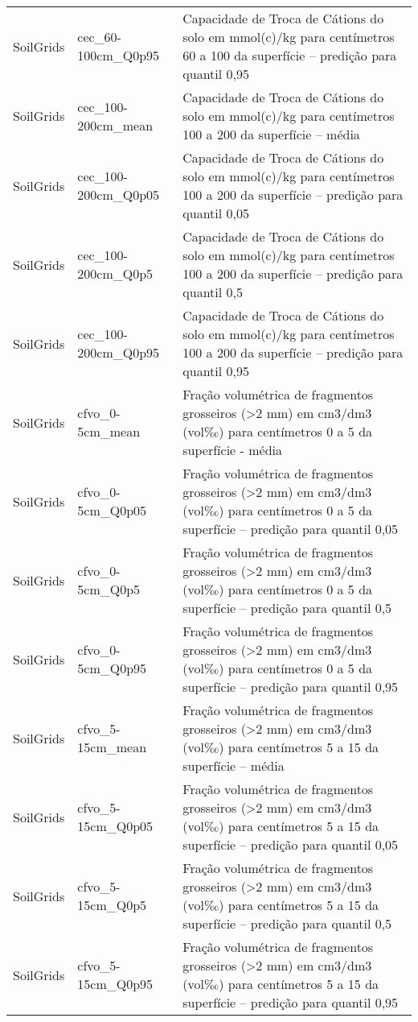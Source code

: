 \begin{longtable}{@{} p{4cm} p{4cm} p{8cm} @{}}
	SoilGrids &
	cec\_60-100cm\_Q0p95 &
	Capacidade de Troca de Cátions do solo em mmol(c)/kg para centímetros 60 a 100 da superfície – predição para quantil 0,95 \\
	SoilGrids &
	cec\_100-200cm\_mean &
	Capacidade de Troca de Cátions do solo em mmol(c)/kg para centímetros 100 a 200 da superfície – média \\
	SoilGrids &
	cec\_100-200cm\_Q0p05 &
	Capacidade de Troca de Cátions do solo em mmol(c)/kg para centímetros 100 a 200 da superfície – predição para quantil 0,05 \\
	SoilGrids &
	cec\_100-200cm\_Q0p5 &
	Capacidade de Troca de Cátions do solo em mmol(c)/kg para centímetros 100 a 200 da superfície – predição para quantil 0,5 \\
	SoilGrids &
	cec\_100-200cm\_Q0p95 &
	Capacidade de Troca de Cátions do solo em mmol(c)/kg para centímetros 100 a 200 da superfície – predição para quantil 0,95 \\
	SoilGrids &
	cfvo\_0-5cm\_mean &
	Fração volumétrica de fragmentos grosseiros (\textgreater 2 mm) em cm3/dm3 (vol‰) para centímetros 0 a 5 da superfície - média \\
	SoilGrids &
	cfvo\_0-5cm\_Q0p05 &
	Fração volumétrica de fragmentos grosseiros (\textgreater 2 mm) em cm3/dm3 (vol‰) para centímetros 0 a 5 da superfície – predição para quantil 0,05 \\
	SoilGrids &
	cfvo\_0-5cm\_Q0p5 &
	Fração volumétrica de fragmentos grosseiros (\textgreater 2 mm) em cm3/dm3 (vol‰) para centímetros 0 a 5 da superfície – predição para quantil 0,5 \\
	SoilGrids &
	cfvo\_0-5cm\_Q0p95 &
	Fração volumétrica de fragmentos grosseiros (\textgreater 2 mm) em cm3/dm3 (vol‰) para centímetros 0 a 5 da superfície – predição para quantil 0,95 \\
	SoilGrids &
	cfvo\_5-15cm\_mean &
	Fração volumétrica de fragmentos grosseiros (\textgreater 2 mm) em cm3/dm3 (vol‰) para centímetros 5 a 15 da superfície – média \\
	SoilGrids &
	cfvo\_5-15cm\_Q0p05 &
	Fração volumétrica de fragmentos grosseiros (\textgreater 2 mm) em cm3/dm3 (vol‰) para centímetros 5 a 15 da superfície – predição para quantil 0,05 \\
	SoilGrids &
	cfvo\_5-15cm\_Q0p5 &
	Fração volumétrica de fragmentos grosseiros (\textgreater 2 mm) em cm3/dm3 (vol‰) para centímetros 5 a 15 da superfície – predição para quantil 0,5 \\
	SoilGrids &
	cfvo\_5-15cm\_Q0p95 &
	Fração volumétrica de fragmentos grosseiros (\textgreater 2 mm) em cm3/dm3 (vol‰) para centímetros 5 a 15 da superfície – predição para quantil 0,95 \\

\end{longtable}
